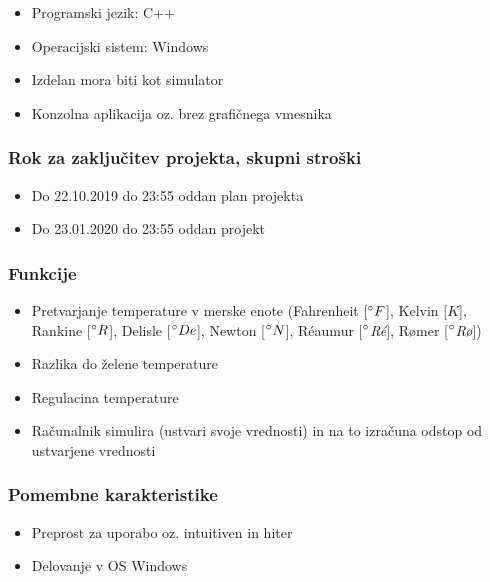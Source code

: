 \documentclass[a4paper,12pt]{article}
\begin{document}
				\begin{itemize}
					\item Programski jezik: C++
					\item Operacijski sistem: Windows
					\item Izdelan mora biti kot simulator
					\item Konzolna aplikacija oz. brez grafičnega vmesnika
				\end{itemize}

		\subsubsection{Rok za zaključitev projekta, skupni stroški}

				\begin{itemize}
					\item Do 22.10.2019 do 23:55 oddan plan projekta 
					\item Do 23.01.2020 do 23:55 oddan projekt
				\end{itemize}

		\subsubsection{Funkcije}

				\begin{itemize}
						\item Pretvarjanje temperature v merske enote (Fahrenheit [$\degree F$], Kelvin [$K$], Rankine [$\degree R$], Delisle [$\degree De$], Newton [$\degree N$], Réaumur [$\degree $\textit{Ré}], Rømer [$\degree$\textit{Rø}])
					\item Razlika do želene temperature
					\item Regulacina temperature
					\item Računalnik simulira (ustvari svoje vrednosti) in na to	izračuna odstop od ustvarjene vrednosti
				\end{itemize}

		\subsubsection{Pomembne karakteristike}

				\begin{itemize}
					\item Preprost za uporabo oz. intuitiven in hiter
					\item Delovanje v OS Windows
				\end{itemize}
\end{document}
